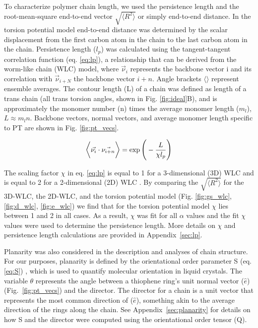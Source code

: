 To characterize polymer chain length, we used the persistence length and the root-mean-square end-to-end vector $\sqrt{\big \langle R^2 \big \rangle}$ or simply end-to-end distance. In the torsion potential model end-to-end distance was determined by the scalar displacement from the first carbon atom in the chain to the last carbon atom in the chain. Persistence length ($l_p$) was calculated using the tangent-tangent correlation function (eq. \ref{eq:lp}), a relationship that can be derived from the worm-like chain (WLC) model, where $\vec{\nu}_i$ represents the backbone vector i and its correlation with $\vec{\nu}_{i+N}$ the backbone vector $i+n$. Angle brackets $\big \langle \big \rangle$ represent ensemble averages. The contour length (L) of a chain was defined as length of a trans chain (all trans torsion angles, shown in Fig. \ref{fig:ideal}B), and is approximately the monomer number (n) times the average monomer length ($m_l$), $L \approx m_ln$. Backbone vectors, normal vectors, and average monomer length specific to PT are shown in Fig. \ref{fig:pt_vecs}.

\begin{equation}
\large
\Big \langle \large \Vec{\nu_i} \cdot \Vec{\nu_{i+n}} \Big \rangle = \exp{\bigg(-\frac{L}{\chi l_p}\bigg)}
\label{eq:lp}
\end{equation}

The scaling factor $\chi$ in eq. \ref{eq:lp} is equal to 1 for a 3-dimensional (3D) WLC and is equal to 2 for a 2-dimensional (2D) WLC \cite{Meyer2016}. By comparing the $\sqrt{\big \langle R^2 \big \rangle}$ for the 3D-WLC, the 2D-WLC, and the torsion potential model (Fig. \ref{fig:gs_wlc}, \ref{fig:d_wlc}, \ref{fig:e_wlc}) we find that for the torsion potential model $\chi$ lies between 1 and 2 in all cases. As a result, $\chi$ was fit for all $\alpha$ values and the fit $\chi$ values were used to determine the persistence length. More details on $\chi$ and persistence length calculations are provided in Appendix~\ref{sec:lp}.

Planarity was also considered in the description and analyses of chain structure. For our purposes, planarity is defined by the orientational order parameter S (eq. \ref{eq:S}) \cite{Allen2017}, which is used to quantify molecular orientation in liquid crystals. The variable $\theta$ represents the angle between a thiophene ring's unit normal vector ($\hat{e}$) (Fig.~\ref{fig:pt_vecs}) and the director. The director for a chain is a unit vector that represents the most common direction of ($\hat{e}$), something akin to the average direction of the rings along the chain. See Appendix~\ref{sec:planarity} for details on how S and the director were computed using the orientational order tensor (Q).


